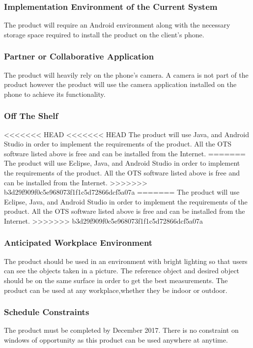 \documentclass[12pt, titlepage]{article}
\begin{document}
\subsubsection{Implementation Environment of the Current System}
The product will require an Android environment along with the necessary storage space required to install the product on the client’s phone.

\subsubsection{Partner or Collaborative Application}
The product will heavily rely on the phone’s camera. A camera is not part of the product however the product will use the camera application installed on the phone to achieve its functionality.

\subsubsection{Off The Shelf}
<<<<<<< HEAD
<<<<<<< HEAD
The product will use Java, and Android Studio in order to implement the requirements of the product. All the OTS software listed above is free and can be installed from the Internet.
=======
The product will use Eclipse, Java, and Android Studio in order to implement the requirements of the product. All the OTS software listed above is free and can be installed from the Internet.
>>>>>>> b3d29f909f0c5e968073f1f1c5d72866dcf5a07a
=======
The product will use Eclipse, Java, and Android Studio in order to implement the requirements of the product. All the OTS software listed above is free and can be installed from the Internet.
>>>>>>> b3d29f909f0c5e968073f1f1c5d72866dcf5a07a

\subsubsection{Anticipated Workplace Environment}
The product should be used in an environment with bright lighting so that users can see the objects taken in a picture. The reference object and desired object should be on the same surface in order to get the best measurements. The product can be used at any workplace,whether they be indoor or outdoor. 

\subsubsection{Schedule Constraints}
The product must be completed by December 2017. There is no constraint on windows of opportunity as this product can be used anywhere at anytime. 
\end{document}
